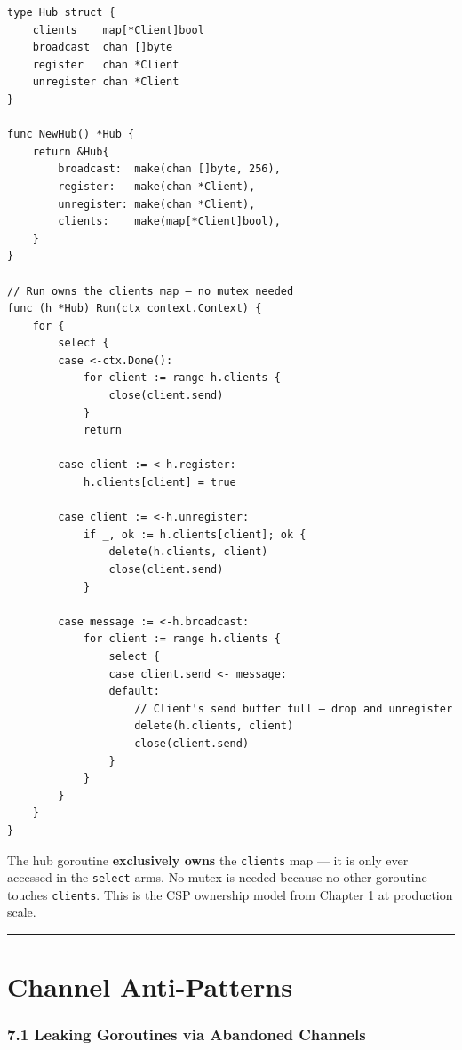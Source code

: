 \documentclass[11pt,a4paper,oneside]{book}
\begin{document}
\begin{verbatim}
type Hub struct {
    clients    map[*Client]bool
    broadcast  chan []byte
    register   chan *Client
    unregister chan *Client
}

func NewHub() *Hub {
    return &Hub{
        broadcast:  make(chan []byte, 256),
        register:   make(chan *Client),
        unregister: make(chan *Client),
        clients:    make(map[*Client]bool),
    }
}

// Run owns the clients map — no mutex needed
func (h *Hub) Run(ctx context.Context) {
    for {
        select {
        case <-ctx.Done():
            for client := range h.clients {
                close(client.send)
            }
            return

        case client := <-h.register:
            h.clients[client] = true

        case client := <-h.unregister:
            if _, ok := h.clients[client]; ok {
                delete(h.clients, client)
                close(client.send)
            }

        case message := <-h.broadcast:
            for client := range h.clients {
                select {
                case client.send <- message:
                default:
                    // Client's send buffer full — drop and unregister
                    delete(h.clients, client)
                    close(client.send)
                }
            }
        }
    }
}
\end{verbatim}

The hub goroutine \textbf{exclusively owns} the \texttt{clients} map ---
it is only ever accessed in the \texttt{select} arms. No mutex is needed
because no other goroutine touches \texttt{clients}. This is the CSP
ownership model from Chapter 1 at production scale.

\begin{center}\rule{0.5\linewidth}{0.5pt}\end{center}

\section{Channel Anti-Patterns}

\subsubsection{7.1 Leaking Goroutines via Abandoned
Channels}
\end{document}
